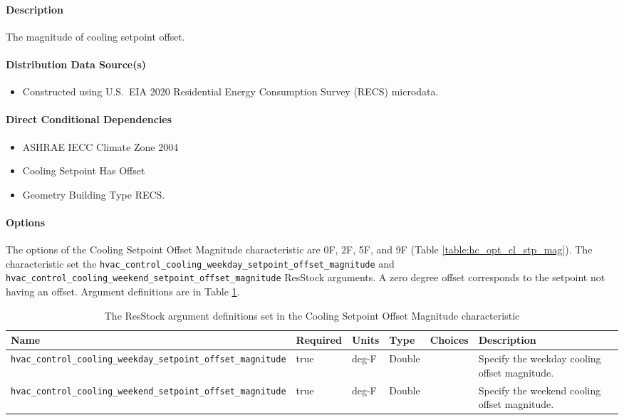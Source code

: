 \paragraph{Description}
The magnitude of cooling setpoint offset.

\paragraph{Distribution Data Source(s)}
\begin{itemize}
    \item Constructed using U.S.~EIA 2020 Residential Energy Consumption Survey (RECS) microdata.
\end{itemize}

\paragraph{Direct Conditional Dependencies}
\begin{itemize}
    \item ASHRAE IECC Climate Zone 2004
    \item Cooling Setpoint Has Offset
    \item Geometry Building Type RECS.
\end{itemize}

\paragraph{Options}
The options of the Cooling Setpoint Offset Magnitude characteristic are 0\degree F, 2\degree F, 5\degree F, and 9\degree F (Table \ref{table:hc_opt_cl_stp_mag}). The characteristic set the \texttt{hvac\_control\_cooling\_weekday\_setpoint\_offset\_magnitude} and
\texttt{hvac\_control\_cooling\_weekend\_setpoint\_offset\_magnitude} ResStock arguments. A zero degree offset corresponds to the setpoint not having an offset. Argument definitions are in Table \ref{table:hc_arg_def_cl_stp_mag}. 

\begin{longtable}[]{ |p{}|p{1.5cm}|p{1cm}|p{1.1cm}|p{1.4cm}|p{6cm}| }
\caption{The ResStock argument definitions set in the Cooling Setpoint Offset Magnitude characteristic} \label{table:hc_arg_def_cl_stp_mag} \\
\toprule\noalign{}
Name & Required & Units & Type & Choices & Description \\
\midrule\noalign{}
\endhead
\bottomrule\noalign{}
\endlastfoot
\texttt{hvac\_control\_cooling\_weekday\_setpoint\_offset\_magnitude} &
true & deg-F & Double & & Specify the weekday cooling offset
magnitude. \\
\hline
\texttt{hvac\_control\_cooling\_weekend\_setpoint\_offset\_magnitude} &
true & deg-F & Double & & Specify the weekend cooling offset
magnitude. \\
\end{longtable}

